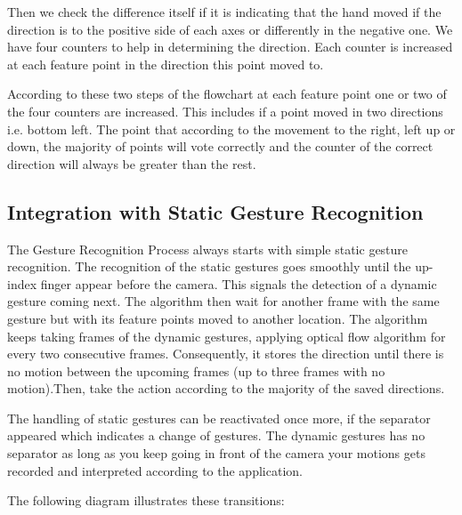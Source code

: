 \documentclass[12pt,fleqn]{book} %
\begin{document}
Then we check the difference itself if it is indicating that the hand moved if the direction is to the positive side of each axes or differently in the negative one. We have four counters to help in determining the direction. Each counter is increased at each feature point in the direction this point moved to.\bigskip


According to these two steps of the flowchart at each feature point one or two of the four counters are increased. This includes if a point moved in two directions i.e. bottom left. The point that according to the movement to the right, left up or down, the majority of points will vote correctly and the counter of the correct direction will always be greater than the rest. \bigskip

\subsection{Integration with Static Gesture Recognition}
The Gesture Recognition Process always starts with simple static gesture recognition. The recognition of the static gestures goes smoothly until the up-index finger appear before the camera. This signals the detection of a dynamic gesture coming next. The algorithm then wait for another frame with the same gesture but with its feature points moved to another location. The algorithm keeps taking frames of the dynamic gestures, applying optical flow algorithm for every two consecutive frames. Consequently, it stores the direction until there is no motion between the upcoming frames (up to three frames with no motion).Then, take the action according to the majority of the saved directions.\bigskip


The handling of static gestures can be reactivated once more, if the separator appeared which indicates a change of gestures. The dynamic gestures has no separator as long as you keep going in front of the camera your motions gets recorded and interpreted according to the application.\bigskip


The following diagram illustrates these transitions:
\end{document}
